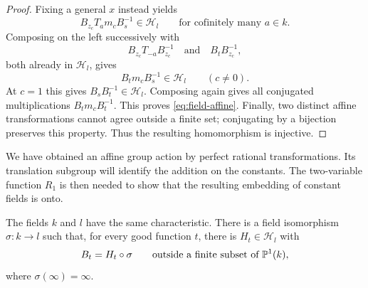 \begin{proof}
Fixing a general \(x\) instead yields
\[
 B_{z_c}T_a m_cB_s^{-1}\in\mathcal H_l
 \qquad\text{for cofinitely many }a\in k.
\]
Composing on the left successively with
\[
 B_{z_c}T_{-a}B_{z_c}^{-1}
 \quad\text{and}\quad
 B_tB_{z_c}^{-1},
\]
both already in \(\mathcal H_l\), gives
\[
 B_t m_cB_s^{-1}\in\mathcal H_l\qquad(c\ne0).
\]
At \(c=1\) this gives \(B_sB_t^{-1}\in\mathcal H_l\).  Composing again
gives all conjugated multiplications \(B_t m_cB_t^{-1}\).  This proves
\eqref{eq:field-affine}.  Finally, two distinct affine transformations
cannot agree outside a finite set; conjugating by a bijection preserves
this property.  Thus the resulting homomorphism is injective.
\end{proof}

We have obtained an affine group action by perfect rational transformations.
Its translation subgroup will identify the addition on the constants.
The two-variable function \(R_1\) is then needed to show that the resulting
embedding of constant fields is onto.

\begin{proposition}\label{prop:constant-alignment}
The fields \(k\) and \(l\) have the same characteristic.  There is a field
isomorphism \(\sigma:k\longrightarrow l\) such that, for every good function
\(t\), there is \(H_t\in\mathcal H_l\) with
\begin{equation}\label{eq:field-alignment}
 B_t=H_t\circ\sigma
 \qquad\text{outside a finite subset of }\mathbb P^1(k),
\end{equation}
where \(\sigma(\infty)=\infty\).
\end{proposition}

